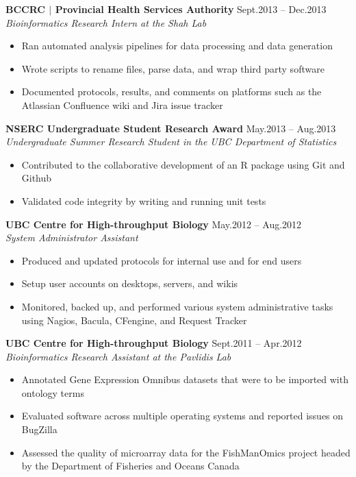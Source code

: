 \documentclass{res}
\newcommand{\linehead}[2]{%
  {\bf #1} \hfill #2\\}
\newcommand{\linetitle}[1]{%
  {\sl #1}}
\begin{document}
\begin{resume}
\linehead{BCCRC $|$ Provincial Health Services Authority}{Sept.2013 -- Dec.2013}
\linetitle{Bioinformatics Research Intern at the Shah Lab}
\begin{itemize}
  \item Ran automated analysis pipelines for data processing and data generation
  \item Wrote scripts to rename files, parse data, and wrap third party software
  \item Documented protocols, results, and comments on platforms such as the Atlassian Confluence wiki and Jira issue tracker
\end{itemize}

\linehead{NSERC Undergraduate Student Research Award}{May.2013 -- Aug.2013}
\linetitle{Undergraduate Summer Research Student in the UBC Department of Statistics}
\begin{itemize}
  \item Contributed to the collaborative development of an R package using Git and Github
  \item Validated code integrity by writing and running unit tests
\end{itemize}

\linehead{UBC Centre for High-throughput Biology}{May.2012 -- Aug.2012}
\linetitle{System Administrator Assistant}
\begin{itemize}
  \item Produced and updated protocols for internal use and for end users
  \item Setup user accounts on desktops, servers, and wikis
  \item Monitored, backed up, and performed various system administrative tasks using Nagios, Bacula, CFengine, and Request Tracker
\end{itemize}

\linehead{UBC Centre for High-throughput Biology}{Sept.2011 -- Apr.2012}
\linetitle{Bioinformatics Research Assistant at the Pavlidis Lab}
\begin{itemize}
  \item Annotated Gene Expression Omnibus datasets that were to be imported with ontology terms
  \item Evaluated software across multiple operating systems and reported issues on BugZilla
  \item Assessed the quality of microarray data for the FishManOmics project headed by the Department of Fisheries and Oceans Canada
\end{itemize}


\end{resume}
\end{document}
